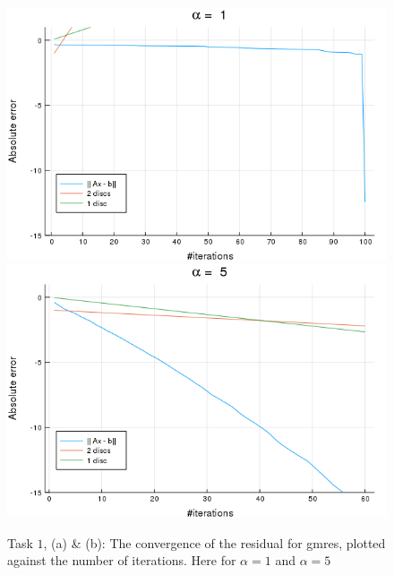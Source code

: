 \begin{figure}[h!]
\centering
\includegraphics[scale=0.4]{../task2/images/Task2_ab_a1_conv.png}
\includegraphics[scale=0.4]{../task2/images/Task2_ab_a5_conv.png}
\caption{Task $1$, (a) \& (b): The convergence of the residual for gmres, plotted against the number of iterations. Here for $\alpha=1$ and $\alpha=5$}
\label{fig:task2a_1_5}
\end{figure}

